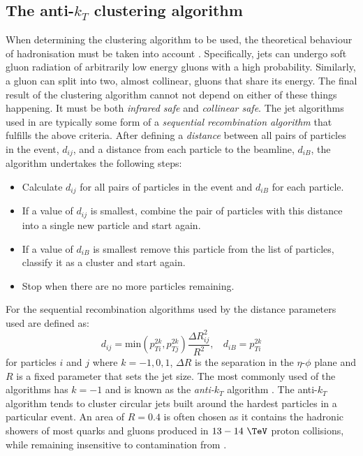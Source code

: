 \subsection{The anti-$k_T$ clustering algorithm}

When determining the clustering algorithm to be used, the theoretical
behaviour of hadronisation must be taken into account
\cite{Salam2010}. Specifically, jets can undergo soft gluon radiation
of arbitrarily low energy gluons with a high probability.
Similarly, a gluon can split into two, almost collinear, gluons that share its energy.
The final result of the clustering algorithm cannot not depend
on either of these things happening. It must be both
\emph{infrared safe} and \emph{collinear safe}. The jet algorithms used in \CMS are
typically some form of a \emph{sequential recombination algorithm} that
fulfills the above criteria. After defining a \emph{distance}
between all pairs of particles in the event, $d_{ij}$, and a distance
from each particle to the beamline, $d_{iB}$, the algorithm undertakes
the following steps:
\begin{itemize}
\item{Calculate $d_{ij}$ for all pairs of particles in the event and
$d_{iB}$ for each particle.}
\item{If a value of $d_{ij}$ is smallest, combine the pair of particles
with this distance into a single new particle and start again.}
\item{If a value of $d_{iB}$ is smallest remove this particle from the
list of particles, classify it as a cluster and start again.}
\item{Stop when there are no more particles remaining.}
\end{itemize}
For the sequential recombination algorithms used by \CMS the distance
parameters used are defined as:
\begin{equation} \label{eq:antiktdij}
d_{ij} = \textrm{min}(p_{Ti}^{2k},p_{Tj}^{2k})\frac{\Delta R_{ij}^2}{R^2} ,~~~~d_{iB} = p_{Ti}^{2k}
\end{equation} 
for particles $i$ and $j$ where $k=-1,0,1$, $\Delta R$
is the separation in the $\eta$-$\phi$ plane and $R$ is a fixed
parameter that sets the jet size. The most commonly used of the \CMS
algorithms has $k=-1$ and is known as the \emph{anti-$k_T$} algorithm
\cite{1126-6708-2008-04-063}. The anti-$k_T$ algorithm tends to
cluster circular jets built around the hardest particles in a
particular event. An area of $R=0.4$ is often
chosen as it contains the hadronic showers of most quarks and gluons
produced in $13-14~\tev$ proton collisions, while remaining
insensitive to contamination from \PU.

